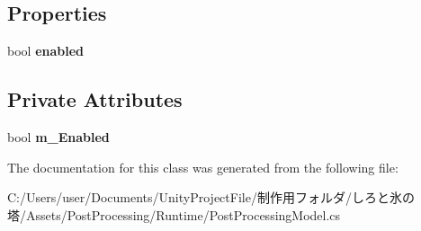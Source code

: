 \subsection*{Properties}
\begin{DoxyCompactItemize}
\item 
\mbox{\label{class_unity_engine_1_1_post_processing_1_1_post_processing_model_a94ada6da8010b232e32ff65d667db6a3}} 
bool {\bfseries enabled}
\end{DoxyCompactItemize}
\subsection*{Private Attributes}
\begin{DoxyCompactItemize}
\item 
\mbox{\label{class_unity_engine_1_1_post_processing_1_1_post_processing_model_a54cb22df6419de36ba9d6d171beb9fde}} 
bool {\bfseries m\+\_\+\+Enabled}
\end{DoxyCompactItemize}


The documentation for this class was generated from the following file\+:\begin{DoxyCompactItemize}
\item 
C\+:/\+Users/user/\+Documents/\+Unity\+Project\+File/制作用フォルダ/しろと氷の塔/\+Assets/\+Post\+Processing/\+Runtime/Post\+Processing\+Model.\+cs\end{DoxyCompactItemize}
